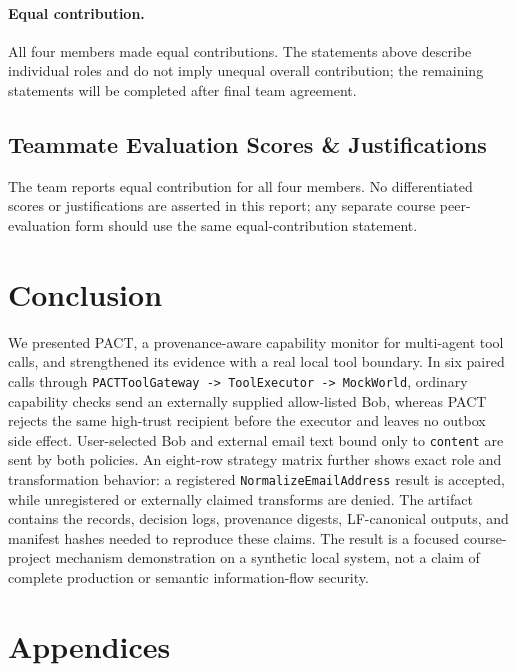 \documentclass[journal]{IEEEtran}
\begin{document}
\paragraph{Equal contribution.}
All four members made equal contributions.  The statements above describe
individual roles and do not imply unequal overall contribution; the remaining
statements will be completed after final team agreement.

\subsection{Teammate Evaluation Scores \& Justifications}

The team reports equal contribution for all four members.  No differentiated
scores or justifications are asserted in this report; any separate course
peer-evaluation form should use the same equal-contribution statement.

\section{Conclusion}

We presented PACT, a provenance-aware capability monitor for multi-agent tool
calls, and strengthened its evidence with a real local tool boundary.  In six
paired calls through \texttt{PACTToolGateway -> ToolExecutor -> MockWorld},
ordinary capability checks send an externally supplied allow-listed Bob,
whereas PACT rejects the same high-trust recipient before the executor and
leaves no outbox side effect.  User-selected Bob and external email text bound
only to \texttt{content} are sent by both policies.  An eight-row strategy matrix
further shows exact role and transformation behavior: a registered
\texttt{NormalizeEmailAddress} result is accepted, while unregistered or
externally claimed transforms are denied.  The artifact contains the records,
decision logs, provenance digests, LF-canonical outputs, and manifest hashes
needed to reproduce these claims.  The result is a focused course-project
mechanism demonstration on a synthetic local system, not a claim of complete
production or semantic information-flow security.

\nocite{*}



\newpage
\section*{Appendices}
\end{document}
